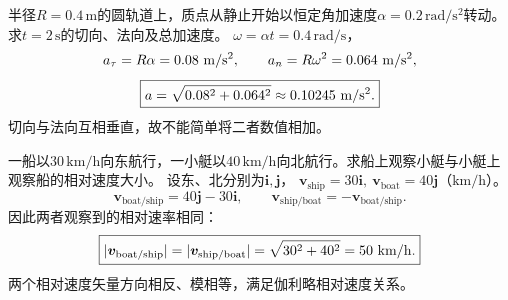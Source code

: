 \problemtext 半径$R=0.4\,\mathrm m$的圆轨道上，质点从静止开始以恒定角加速度$\alpha=0.2\,\mathrm{rad/s^2}$转动。求$t=2\,\mathrm s$的切向、法向及总加速度。
\workings
$\omega=\alpha t=0.4\,\mathrm{rad/s}$，
\[
a_\tau=R\alpha=0.08\ {\rm m/s^2},\qquad
a_n=R\omega^2=0.064\ {\rm m/s^2},
\]
\[
\boxed{a=\sqrt{0.08^2+0.064^2}\approx0.10245\ {\rm m/s^2}.}
\]
\crosscheck 切向与法向互相垂直，故不能简单将二者数值相加。

\problemtext 一船以$30\,\mathrm{km/h}$向东航行，一小艇以$40\,\mathrm{km/h}$向北航行。求船上观察小艇与小艇上观察船的相对速度大小。
\workings
设东、北分别为$\bm i,\bm j$，
$\bm v_{\mathrm{ship}}=30\bm i,\ \bm v_{\mathrm{boat}}=40\bm j$（$\mathrm{km/h}$）。
\[
\bm v_{\mathrm{boat/ship}}=40\bm j-30\bm i,\qquad
\bm v_{\mathrm{ship/boat}}=-\bm v_{\mathrm{boat/ship}}.
\]
因此两者观察到的相对速率相同：
\[
\boxed{|\bm v_{\mathrm{boat/ship}}|=|\bm v_{\mathrm{ship/boat}}|
=\sqrt{30^2+40^2}=50\ {\rm km/h}.}
\]
\crosscheck 两个相对速度矢量方向相反、模相等，满足伽利略相对速度关系。
